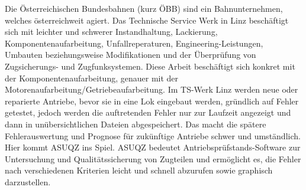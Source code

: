 Die Österreichischen Bundesbahnen (kurz ÖBB) sind ein Bahnunternehmen, welches österreichweit agiert. Das Technische Service Werk
in Linz beschäftigt sich mit leichter und schwerer Instandhaltung, Lackierung, Komponentenaufarbeitung, Unfallreperaturen,
Engineering-Leistungen, Umbauten beziehungsweise Modifikationen und der Überprüfung von Zugsicherungs- und Zugfunksystemen.
Diese Arbeit beschäftigt sich konkret mit der Komponentenaufarbeitung, genauer mit der Motorenaufarbeitung/Getriebeaufarbeitung.
Im TS-Werk Linz werden neue oder reparierte Antriebe, bevor sie in eine Lok eingebaut werden, gründlich auf Fehler getestet, jedoch
werden die auftretenden Fehler nur zur Laufzeit angezeigt und dann in unübersichtlichen Dateien abgespeichert. Das macht die 
spätere Fehlerauswertung und Prognose für zukünftige Antriebe schwer und umständlich. Hier kommt ASUQZ ins Spiel. ASUQZ bedeutet
Antriebsprüfstands-Software zur Untersuchung und Qualitätssicherung von Zugteilen und ermöglicht es, 
die Fehler nach verschiedenen Kriterien leicht und schnell abzurufen sowie graphisch darzustellen.